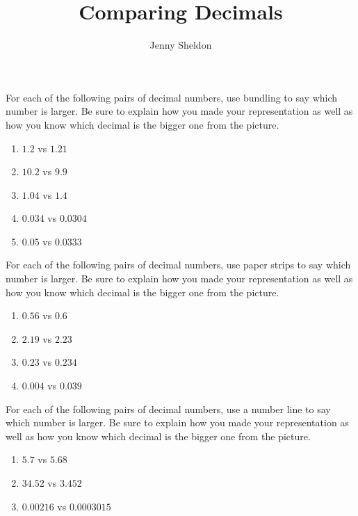 \documentclass[nooutcomes,noauthor,handout]{ximera}
\title{Comparing Decimals}
\author{Jenny Sheldon}
\begin{document}
\begin{abstract} \end{abstract}
\maketitle



\begin{problem}
For each of the following pairs of decimal numbers, use bundling to say which number is larger. Be sure to explain how you made your representation as well as how you know which decimal is the bigger one from the picture.
\begin{enumerate}
\item $1.2$ vs $1.21$
\item $10.2$ vs $9.9$
\item $1.04$ vs $1.4$
\item $0.034$ vs $0.0304$
\item $0.05$ vs $0.0333$
\end{enumerate}

\end{problem}

\begin{problem}
For each of the following pairs of decimal numbers, use paper strips to say which number is larger. Be sure to explain how you made your representation as well as how you know which decimal is the bigger one from the picture.
\begin{enumerate}
\item $0.56$ vs $0.6$
\item $2.19$ vs $2.23$
\item $0.23$ vs $0.234$
\item $0.004$ vs $0.039$
\end{enumerate}

\end{problem}

\begin{problem}
For each of the following pairs of decimal numbers, use a number line to say which number is larger. Be sure to explain how you made your representation as well as how you know which decimal is the bigger one from the picture.
\begin{enumerate}
\item $5.7$ vs $5.68$
\item $34.52$ vs $3.452$
\item $0.00216$ vs $0.0003015$
\end{enumerate}

\end{problem}
\end{document}
